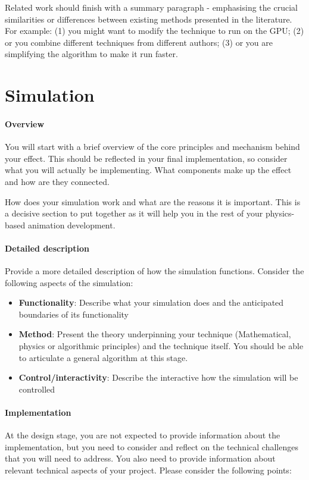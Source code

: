 \documentclass[conference,backref=page]{acmsiggraph}
\begin{document}
Related work should finish with a summary paragraph - emphasising the crucial similarities or differences between existing methods presented in the literature.  For example: (1) you might want to modify the technique to run on the GPU; (2) or you combine different techniques from different authors; (3) or you are simplifying the algorithm to make it run faster.

\section{Simulation}

\paragraph{Overview}
You will start with a brief overview of the core principles and mechanism behind your effect.  This should be reflected in your final implementation, so consider what you will actually be implementing. What components make up the effect and how are they connected.

How does your simulation work and what are the reasons it is important.  This is a decisive section to put together as it will help you in the rest of your physics-based animation development.

\paragraph{Detailed description}
Provide a more detailed description of how the simulation functions. Consider the following aspects of the simulation:
\begin{itemize}
\item {\bf Functionality}: Describe what your simulation does and the anticipated boundaries of its functionality
\item {\bf Method}: Present the theory underpinning your technique (Mathematical, physics or algorithmic principles) and the technique itself. You should be able to articulate a general algorithm at this stage.
\item {\bf Control/interactivity}: Describe the interactive how the simulation will be controlled
\end{itemize}

\paragraph{Implementation}
At the design stage, you are not expected to provide information about the implementation, but you need to consider and reflect on the technical challenges that you will need to address. You also need to provide information about relevant technical aspects of your project. Please consider the following points:
\end{document}
